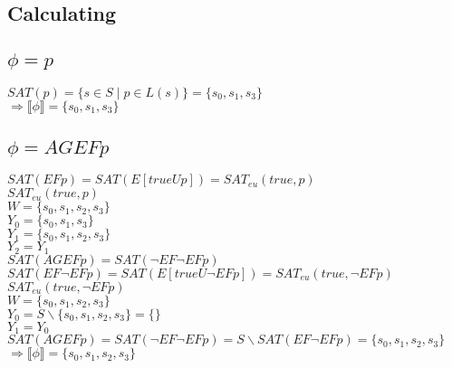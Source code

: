 \documentclass[a4paper]{article}
\begin{document}
\subsection*{Calculating}

\subsection*{$\phi = p$}
\hspace*{5mm} $SAT(p)=\{ s \in S \mid p\in L(s)\} = \{s_0,s_1,s_3\}$ 
\\[0.25cm] 
\hspace*{5mm} $\Rightarrow \llbracket \phi \rrbracket = \{s_0,s_1,s_3\}$
\subsection*{$\phi = AGEFp$}
\hspace*{5mm} $SAT(EFp)=SAT(E[trueUp])=SAT_{eu}(true,p)$ 
\\[0.25cm] 
\hspace*{5mm}$SAT_{eu}(true,p)$ 
\\[0.25cm] 
\hspace*{10mm} $W = \{s_0,s_1,s_2,s_3\}$ 
\\[0.25cm] 
\hspace*{10mm} $Y_0 = \{s_0,s_1,s_3\}$ 
\\[0.25cm] 
\hspace*{10mm} $Y_1 = \{s_0,s_1,s_2,s_3\}$ 
\\[0.25cm] 
\hspace*{10mm} $Y_2 = Y_1$ 
\\[0.25cm] 
\hspace*{5mm} $SAT(AGEFp)=SAT(\neg EF \neg EF p)$ 
\\[0.25cm] 
\hspace*{5mm} $SAT(EF \neg EF p) =  SAT(E[trueU\neg EF p]) = SAT_{eu}(true,\neg EF p)$ 
\\[0.25cm] 
\hspace*{5mm} $SAT_{eu}(true,\neg EF p)$ 
\\[0.25cm] 
\hspace*{10mm} $W = \{s_0,s_1,s_2,s_3\}$ 
\\[0.25cm] 
\hspace*{10mm} $Y_0 = S \backslash \{s_0,s_1,s_2,s_3\} = \{ \}$ 
\\[0.25cm] 
\hspace*{10mm} $Y_1 = Y_0$ 
\\[0.25cm] 
\hspace*{4.9mm} $SAT(AGEFp)=SAT(\neg EF \neg EF p) = S\backslash SAT(EF \neg EF p) = \{s_0,s_1,s_2,s_3 \}$ 
\\[0.25cm] 
\hspace*{5mm} $\Rightarrow \llbracket \phi \rrbracket = \{s_0,s_1,s_2,s_3\}$
\end{document}
